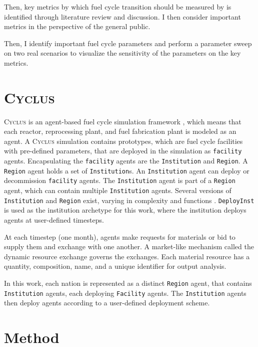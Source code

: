 \documentclass{article}
\newcommand{\Cyclus}{\textsc{Cyclus}\xspace}%
\begin{document}
Then, key metrics by which fuel cycle transition should be measured by
is identified through literature review and discussion. I then
consider important metrics in the perspective of the general public.

Then, I identify important fuel cycle parameters and perform a parameter
sweep on two real scenarios to visualize the sensitivity of the parameters
on the key metrics.

\section{\Cyclus}

\Cyclus is an agent-based fuel cycle simulation framework 
\cite{huff_fundamental_2016}, which means 
that each reactor, reprocessing plant, and fuel fabrication plant is modeled as an agent.
A \Cyclus simulation contains prototypes, which are fuel cycle facilities with
pre-defined parameters, that are deployed in the simulation as \texttt{facility} agents.
Encapsulating the \texttt{facility} agents are the \texttt{Institution} and \texttt{Region}.
A \texttt{Region} agent holds a set of \texttt{Institution}s. 
An \texttt{Institution} agent can deploy or decommission \texttt{facility} agents.
The \texttt{Institution} agent is part of a \texttt{Region} agent,
which can contain multiple \texttt{Institution} agents. Several versions of \texttt{Institution}
and \texttt{Region} exist, varying in complexity and functions \cite{huff_extensions_2014}.
 \texttt{DeployInst} is used as the institution archetype for this work, where the institution
deploys agents at user-defined timesteps. 

At each timestep (one month),
agents make requests for materials or bid to supply them and exchange
with one another. A market-like mechanism called the dynamic resource exchange
\cite{gidden_agent-based_2015} governs the exchanges.
Each material resource has a quantity, composition, name, and a unique identifier
for output analysis. 

In this work, each nation is represented as a distinct \texttt{Region} agent,
that contains \texttt{Institution} agents, each deploying  \texttt{Facility} 
agents. The \texttt{Institution} agents then deploy agents according to 
a user-defined deployment scheme.


\section{Method}
\end{document}
